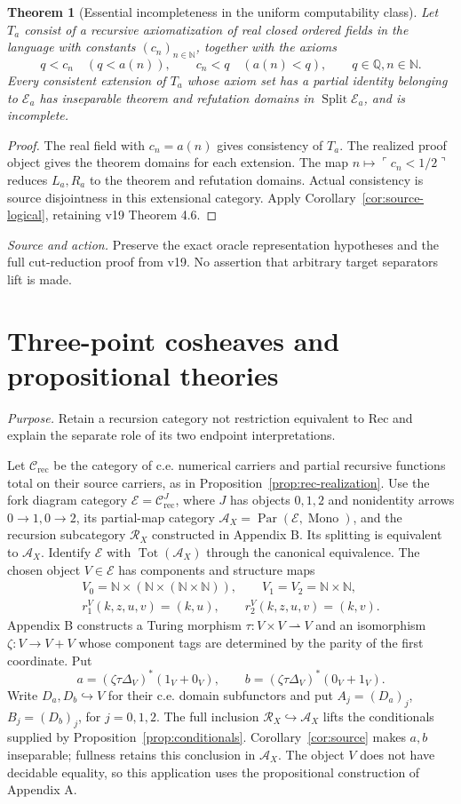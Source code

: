 \documentclass[11pt]{article}
\newtheorem{theorem}{Theorem}[section]
\theoremstyle{definition}\newtheorem{definition}[theorem]{Definition}
\newcommand{\N}{\mathbb N}
\newcommand{\Tot}{\operatorname{Tot}}
\newcommand{\Split}{\operatorname{Split}}
\newcommand{\Par}{\operatorname{Par}}
\newcommand{\R}{\mathscr R}
\newcommand{\A}{\mathcal A}
\newcommand{\E}{\mathcal E}
\newcommand{\source}[1]{\par\smallskip\noindent\textit{Source and action.} #1\par\smallskip}
\newcommand{\purpose}[1]{\noindent\textit{Purpose.} #1\par\medskip}
\begin{document}
\begin{theorem}[Essential incompleteness in the uniform computability class]\label{thm:miller-incomplete}
Let $T_a$ consist of a recursive axiomatization of real closed
ordered fields in the language with constants $(c_n)_{n\in\N}$,
together with the axioms
\[
 q<c_n\quad(q<a(n)),\qquad c_n<q\quad(a(n)<q),
 \qquad q\in\mathbb Q, n\in\N.
\]
Every consistent extension of $T_a$ whose axiom set has a partial
identity belonging to $\E_a$ has inseparable theorem and refutation
domains in $\Split\E_a$, and is incomplete.
\end{theorem}
\begin{proof}
The real field with $c_n=a(n)$ gives consistency of $T_a$.
The realized proof object gives the theorem domains for each
extension. The map $n\mapsto\ulcorner c_n<1/2\urcorner$ reduces
$L_a,R_a$ to the theorem and refutation domains. Actual consistency
is source disjointness in this extensional category. Apply
Corollary~\ref{cor:source-logical}, retaining v19 Theorem 4.6.
\end{proof}
\source{Preserve the exact oracle representation hypotheses and the full cut-reduction proof from v19. No assertion that arbitrary target separators lift is made.}

\section{Three-point cosheaves and propositional theories}
\purpose{Retain a recursion category not restriction equivalent to $\mathrm{Rec}$ and explain the separate role of its two endpoint interpretations.}
Let $\mathcal C_{\mathrm{rec}}$ be the category of c.e. numerical
carriers and partial recursive functions total on their source
carriers, as in Proposition~\ref{prop:rec-realization}.
Use the fork diagram category $\E=\mathcal C_{\mathrm{rec}}^{J}$,
where $J$ has objects $0,1,2$ and nonidentity arrows $0\to1,0\to2$,
its partial-map category
$\A_X=\Par(\E,\operatorname{Mono})$, and the recursion subcategory
$\R_X$ constructed in Appendix B. Its splitting is equivalent
to $\A_X$. Identify $\E$ with $\Tot(\A_X)$ through the canonical
equivalence. The chosen object
$V\in\E$ has components and structure maps
\[
 \begin{gathered}
 V_0=\N\times(\N\times(\N\times\N)),\qquad
 V_1=V_2=\N\times\N,\\
 r_1^V(k,z,u,v)=(k,u),\qquad
 r_2^V(k,z,u,v)=(k,v).
 \end{gathered}
\]
Appendix B constructs a Turing morphism
$\tau:V\times V\rightharpoonup V$ and an isomorphism
$\zeta:V\to V+V$ whose component tags are determined by the
parity of the first coordinate. Put
\[
 a=(\zeta\tau\Delta_V)^*(1_V+0_V),\qquad
 b=(\zeta\tau\Delta_V)^*(0_V+1_V).
\]
Write $D_a,D_b\hookrightarrow V$ for their c.e. domain subfunctors
and put $A_j=(D_a)_j$, $B_j=(D_b)_j$, for $j=0,1,2$.
The full inclusion $\R_X\hookrightarrow\A_X$ lifts the
conditionals supplied by Proposition~\ref{prop:conditionals}.
Corollary~\ref{cor:source} makes $a,b$ inseparable; fullness retains
this conclusion in $\A_X$.
The object $V$ does not have decidable equality, so this application
uses the propositional construction of Appendix A.
\end{document}
